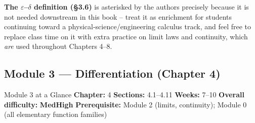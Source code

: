 \documentclass[11pt]{article}
\newcommand{\diffM}{\textcolor{diffamberc}{\textbf{Med}}}
\newcommand{\diffH}{\textcolor{diffredc}{\textbf{High}}}
\begin{document}
\begin{diffbox}
\textbf{The $\varepsilon$--$\delta$ definition (\S3.6)} is asterisked by the authors
precisely because it is not needed downstream in this book -- treat it as enrichment for
students continuing toward a physical-science/engineering calculus track, and feel free to
replace class time on it with extra practice on limit laws and continuity, which
\emph{are} used throughout Chapters 4--8.
\end{diffbox}

\subsection*{Module 3 --- Differentiation (Chapter 4)}

\begin{modulebox}{Module 3 at a Glance}{}
\textbf{Chapter:} 4 \quad\textbf{Sections:} 4.1--4.11 \quad\textbf{Weeks:} 7--10 \quad
\textbf{Overall difficulty:} \diffM\text{--}\diffH \quad
\textbf{Prerequisite:} Module 2 (limits, continuity); Module 0 (all elementary function
families)
\end{modulebox}
\end{document}
